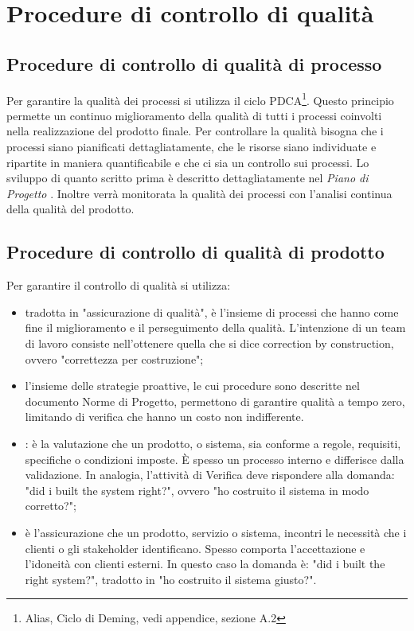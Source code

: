 \newpage

\section{Procedure di controllo di qualità}

\subsection{Procedure di controllo di qualità di processo} %
\label{2.2}
Per garantire la qualità dei processi si utilizza il ciclo PDCA\footnote{Alias, Ciclo di Deming, vedi appendice, sezione A.2}.  Questo principio permette un continuo miglioramento della qualità di tutti i processi coinvolti nella realizzazione del prodotto finale.
Per controllare la qualità bisogna che i processi siano pianificati dettagliatamente, che le risorse siano individuate e ripartite in maniera quantificabile e che ci sia un controllo sui processi. Lo sviluppo di quanto scritto prima è descritto dettagliatamente nel \emph{Piano di Progetto \versionePianoDiProgetto{}}.
Inoltre verrà monitorata la qualità dei processi con l'analisi continua della qualità del prodotto.


\subsection{Procedure di controllo di qualità di prodotto} %
\label{2.3}
Per garantire il controllo di qualità si utilizza:
\begin{itemize}
\item {} tradotta in "assicurazione di qualità", è l'insieme di processi che hanno come fine il miglioramento e il perseguimento della qualità. L'intenzione di un team di lavoro consiste nell'ottenere quella che si dice correction by construction, ovvero "correttezza per costruzione";
\item {} l'insieme delle strategie proattive, le cui procedure sono descritte nel documento Norme di Progetto, permettono di garantire qualità a tempo zero, limitando  di verifica che hanno un costo non indifferente.
\item {}: è la valutazione che un prodotto,  o sistema, sia conforme a regole, requisiti, specifiche o condizioni imposte. È spesso un processo interno e differisce dalla validazione. In analogia, l'attività di Verifica deve rispondere alla domanda: "did i built the system right?", ovvero "ho costruito il sistema in modo corretto?";
\item {} è l'assicurazione che un prodotto, servizio o sistema, incontri le necessità che i clienti o gli stakeholder identificano. Spesso comporta l'accettazione e l'idoneità con clienti esterni. In questo caso la domanda è: "did i built the right system?", tradotto in "ho costruito il sistema giusto?".
\end{itemize}








